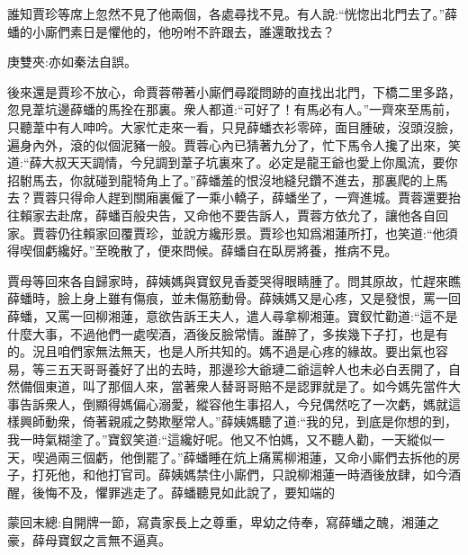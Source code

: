 \begin{parag}
    誰知賈珍等席上忽然不見了他兩個，各處尋找不見。有人說:“恍惚出北門去了。”薛蟠的小廝們素日是懼他的，他吩咐不許跟去，誰還敢找去？\begin{note}庚雙夾:亦如秦法自誤。\end{note}後來還是賈珍不放心，命賈蓉帶著小廝們尋蹤問跡的直找出北門，下橋二里多路，忽見葦坑邊薛蟠的馬拴在那裏。衆人都道:“可好了！有馬必有人。”一齊來至馬前，只聽葦中有人呻吟。大家忙走來一看，只見薛蟠衣衫零碎，面目腫破，沒頭沒臉，遍身內外，滾的似個泥豬一般。賈蓉心內已猜著九分了，忙下馬令人攙了出來，笑道:“薛大叔天天調情，今兒調到葦子坑裏來了。必定是龍王爺也愛上你風流，要你招駙馬去，你就碰到龍犄角上了。”薛蟠羞的恨沒地縫兒鑽不進去，那裏爬的上馬去？賈蓉只得命人趕到關廂裏僱了一乘小轎子，薛蟠坐了，一齊進城。賈蓉還要抬往賴家去赴席，薛蟠百般央告，又命他不要告訴人，賈蓉方依允了，讓他各自回家。賈蓉仍往賴家回覆賈珍，並說方纔形景。賈珍也知爲湘蓮所打，也笑道:“他須得喫個虧纔好。”至晚散了，便來問候。薛蟠自在臥房將養，推病不見。
\end{parag}


\begin{parag}
    賈母等回來各自歸家時，薛姨媽與寶釵見香菱哭得眼睛腫了。問其原故，忙趕來瞧薛蟠時，臉上身上雖有傷痕，並未傷筋動骨。薛姨媽又是心疼，又是發恨，罵一回薛蟠，又罵一回柳湘蓮，意欲告訴王夫人，遣人尋拿柳湘蓮。寶釵忙勸道:“這不是什麼大事，不過他們一處喫酒，酒後反臉常情。誰醉了，多挨幾下子打，也是有的。況且咱們家無法無天，也是人所共知的。媽不過是心疼的緣故。要出氣也容易，等三五天哥哥養好了出的去時，那邊珍大爺璉二爺這幹人也未必白丟開了，自然備個東道，叫了那個人來，當著衆人替哥哥賠不是認罪就是了。如今媽先當件大事告訴衆人，倒顯得媽偏心溺愛，縱容他生事招人，今兒偶然吃了一次虧，媽就這樣興師動衆，倚著親戚之勢欺壓常人。”薛姨媽聽了道:“我的兒，到底是你想的到，我一時氣糊塗了。”寶釵笑道:“這纔好呢。他又不怕媽，又不聽人勸，一天縱似一天，喫過兩三個虧，他倒罷了。”薛蟠睡在炕上痛罵柳湘蓮，又命小廝們去拆他的房子，打死他，和他打官司。薛姨媽禁住小廝們，只說柳湘蓮一時酒後放肆，如今酒醒，後悔不及，懼罪逃走了。薛蟠聽見如此說了，要知端的
\end{parag}


\begin{parag}
    \begin{note}蒙回末總:自開牌一節，寫貴家長上之尊重，卑幼之侍奉，寫薛蟠之醜，湘蓮之豪，薛母寶釵之言無不逼真。\end{note}
\end{parag}

